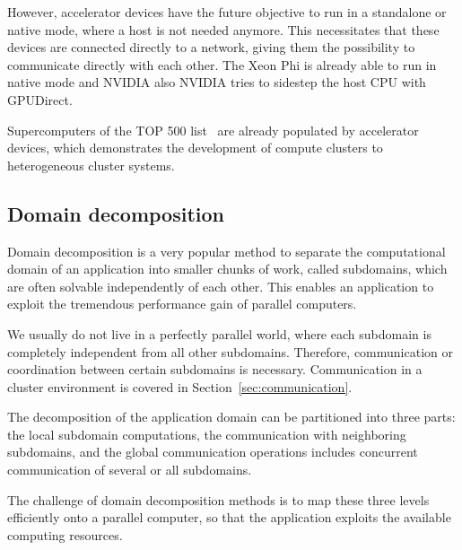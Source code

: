However, accelerator devices have the future objective to run in a
standalone or native mode, where a host is not needed anymore.  This necessitates
that these devices are connected directly to a network,
giving them the possibility to communicate directly with each
other. The Xeon Phi is already able to run in native mode and NVIDIA
also NVIDIA tries to sidestep the host CPU with GPUDirect.

Supercomputers of the TOP 500 list~\cite{ref:top500} are already
populated by accelerator devices, which demonstrates the development
of compute clusters to heterogeneous cluster systems.


\subsection{Domain decomposition}
\label{sec:domain_decomposition}
Domain decomposition is a very popular method to separate the
computational domain of an application into smaller chunks of work,
called subdomains, which are often solvable independently of each
other. This enables an application to exploit the tremendous
performance gain of parallel computers.

We usually do not live in a perfectly parallel world, where each
subdomain is completely independent from all other subdomains.
Therefore, communication or coordination between certain subdomains is
necessary. Communication in a cluster environment is covered in
Section~\ref{sec:communication}.

The decomposition of the application domain can be partitioned into
three parts: the local subdomain computations, the communication with
neighboring subdomains, and the global communication operations
includes concurrent communication of several or all subdomains.

The challenge of domain decomposition methods is to map these three
levels efficiently onto a parallel computer, so that the application
exploits the available computing resources.


